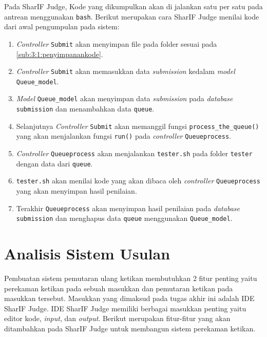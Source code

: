 Pada SharIF Judge, Kode yang dikumpulkan akan di jalankan satu per satu pada antrean menggunakan \verb|bash|. Berikut merupakan cara SharIF Judge menilai kode dari awal pengumpulan pada sistem:

\begin{enumerate}
      \item \textit{Controller} \verb|Submit| akan menyimpan file pada folder sesuai pada \ref{sub:3:1:penyimpanankode}.
      \item \textit{Controller} \verb|Submit| akan memasukkan data \textit{submission} kedalam \textit{model} \verb|Queue_model|.
      \item \textit{Model} \verb|Queue_model| akan menyimpan data \textit{submission} pada \textit{database} \verb|submission| dan menambahkan data \verb|queue|.
      \item Selanjutnya \textit{Controller} \verb|Submit| akan memanggil fungsi \verb|process_the_queue()| yang akan menjalankan fungsi \verb|run()| pada \textit{controller} \verb|Queueprocess|.
      \item \textit{Controller} \verb|Queueprocess| akan menjalankan \verb|tester.sh| pada folder \verb|tester| dengan data dari \verb|queue|.
      \item \verb|tester.sh| akan menilai kode yang akan dibaca oleh \textit{controller} \verb|Queueprocess| yang akan menyimpan hasil penilaian.
      \item Terakhir \verb|Queueprocess| akan menyimpan hasil penilaian pada \textit{database} \verb|submission| dan menghapus data \verb|queue| menggunakan \verb|Queue_model|.
\end{enumerate}


\section{Analisis Sistem Usulan}
\label{sec:3:sistemusulan}

Pembuatan sistem pemutaran ulang ketikan membutuhkan 2 fitur penting yaitu perekaman ketikan pada sebuah masukkan dan pemutaran ketikan pada masukkan tersebut. Masukkan yang dimaksud pada tugas akhir ini adalah IDE SharIF Judge. IDE SharIF Judge memiliki berbagai masukkan penting yaitu editor kode, \textit{input}, dan \textit{output}. Berikut merupakan fitur-fitur yang akan ditambahkan pada SharIF Judge untuk membangun sistem perekaman ketikan.

